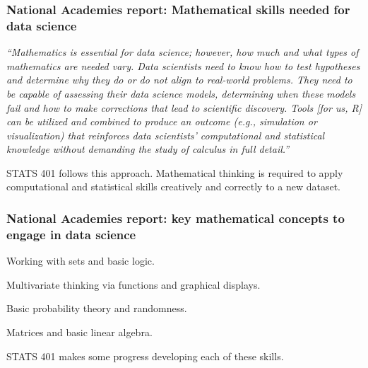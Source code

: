 \documentclass{beamer}
\begin{document}

\begin{frame}
  \frametitle{National Academies report: Mathematical skills needed for data science}

  \begin{myitemize}
    
\item %
{\it ``Mathematics is essential for data science; however, how much and what types of mathematics are needed vary. Data scientists need to know how to test hypotheses and determine why they do or do not align to real-world problems. They need to be capable of assessing their data science models, determining when these models fail and how to make corrections that lead to scientific discovery. Tools [for us, R] can be utilized and combined to produce an outcome (e.g., simulation or visualization) that reinforces data scientists’ computational and statistical knowledge without demanding the study of calculus in full detail.''}

\item STATS 401 follows this approach. Mathematical thinking is required to apply computational and statistical skills creatively and correctly to a new dataset.
  \end{myitemize}
\end{frame}

\begin{frame}
  \frametitle{National Academies report: key mathematical concepts to engage in data science}
  
  \begin{myitemize}
\item Working with sets and basic logic.
\item Multivariate thinking via functions and graphical displays.
\item Basic probability theory and randomness.
\item Matrices and basic linear algebra.
  \end{myitemize}

  \vspace{8mm}
  
  STATS 401 makes some progress developing each of these skills.
  
\end{frame}
\end{document}
